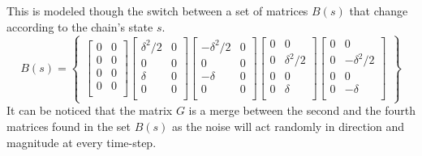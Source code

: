 \documentclass{article}
\begin{document}
\begin{multicols}{2}
    This is modeled though the switch between a set of matrices $B(s)$ that change according to the chain's state $s$.
    \[
        B(s)=\begin{Bmatrix}
            \begin{bmatrix}
                0 & 0 \\
                0          & 0 \\
                0     & 0 \\
                0          & 0 \\
            \end{bmatrix}
            \begin{bmatrix}
                \delta^2/2 & 0 \\
                0          & 0 \\
                \delta     & 0 \\
                0          & 0 \\
            \end{bmatrix}
            \begin{bmatrix}
                -\delta^2/2 & 0 \\
                0          & 0 \\
                -\delta     & 0 \\
                0          & 0 \\
            \end{bmatrix}
            \begin{bmatrix}
                0 & 0          \\
                0 & \delta^2/2 \\
                0 & 0          \\
                0 & \delta     \\
            \end{bmatrix}
            \begin{bmatrix}
                0 & 0          \\
                0 & -\delta^2/2 \\
                0 & 0          \\
                0 & -\delta     \\
            \end{bmatrix}
        \end{Bmatrix}
    \]
    It can be noticed that the matrix $G$ is a merge between the second and the fourth matrices found in the set $B(s)$ as the noise will act
    randomly in direction and magnitude at every time-step.


\end{multicols}
\end{document}
